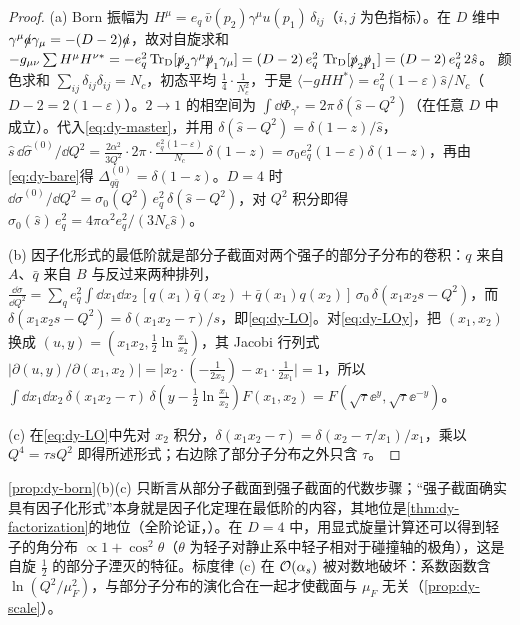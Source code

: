 \begin{proof}
(a) Born 振幅为 $H^\mu=e_q\,\bar v(p_2)\gamma^\mu u(p_1)\,\delta_{ij}$（$i,j$ 为色指标）。在 $D$ 维中 $\gamma^\mu\slashed{a}\gamma_\mu=-(D-2)\slashed{a}$，故对自旋求和
$-g_{\mu\nu}\sum H^\mu H^{\nu*}=-e_q^2\operatorname{Tr}_{\mathrm{D}}[\slashed{p}_2\gamma^\mu\slashed{p}_1\gamma_\mu]=(D-2)\,e_q^2\,\operatorname{Tr}_{\mathrm{D}}[\slashed{p}_2\slashed{p}_1]=(D-2)\,e_q^2\,2\hat s$。
颜色求和 $\sum_{ij}\delta_{ij}\delta_{ij}=N_c$，初态平均 $\frac14\cdot\frac1{N_c^2}$，于是 $\langle-gHH^*\rangle=e_q^2(1-\varepsilon)\hat s/N_c$（$D-2=2(1-\varepsilon)$）。$2\to1$ 的相空间为 $\int\dd\Phi_{\gamma^*}=2\pi\,\delta(\hat s-Q^2)$（在任意 $D$ 中成立）。代入\cref{eq:dy-master}，并用 $\delta(\hat s-Q^2)=\delta(1-z)/\hat s$，
$\hat s\,\dd\hat\sigma^{(0)}/\dd Q^2=\frac{2\alpha^2}{3Q^2}\cdot2\pi\cdot\frac{e_q^2(1-\varepsilon)}{N_c}\,\delta(1-z)=\sigma_0e_q^2(1-\varepsilon)\delta(1-z)$，再由\cref{eq:dy-bare}得 $\Delta^{(0)}_{q\bar q}=\delta(1-z)$。$D=4$ 时 $\dd\hat\sigma^{(0)}/\dd Q^2=\sigma_0(Q^2)\,e_q^2\,\delta(\hat s-Q^2)$，对 $Q^2$ 积分即得 $\sigma_0(\hat s)\,e_q^2=4\pi\alpha^2e_q^2/(3N_c\hat s)$。

(b) 因子化形式的最低阶就是部分子截面对两个强子的部分子分布的卷积：$q$ 来自 $A$、$\bar q$ 来自 $B$ 与反过来两种排列，
$\frac{\dd\sigma}{\dd Q^2}=\sum_qe_q^2\int\dd x_1\dd x_2\,[q(x_1)\bar q(x_2)+\bar q(x_1)q(x_2)]\,\sigma_0\,\delta(x_1x_2s-Q^2)$，而 $\delta(x_1x_2s-Q^2)=\delta(x_1x_2-\tau)/s$，即\cref{eq:dy-LO}。对\cref{eq:dy-LOy}，把 $(x_1,x_2)$ 换成 $(u,y)=(x_1x_2,\frac12\ln\frac{x_1}{x_2})$，其 Jacobi 行列式
$\big|\partial(u,y)/\partial(x_1,x_2)\big|=\big|x_2\cdot(-\tfrac{1}{2x_2})-x_1\cdot\tfrac{1}{2x_1}\big|=1$，所以 $\int\dd x_1\dd x_2\,\delta(x_1x_2-\tau)\,\delta(y-\frac12\ln\frac{x_1}{x_2})F(x_1,x_2)=F(\sqrt\tau\ee^{y},\sqrt\tau\ee^{-y})$。

(c) 在\cref{eq:dy-LO}中先对 $x_2$ 积分，$\delta(x_1x_2-\tau)=\delta(x_2-\tau/x_1)/x_1$，乘以 $Q^4=\tau sQ^2$ 即得所述形式；右边除了部分子分布之外只含 $\tau$。
\end{proof}

\cref{prop:dy-born}(b)(c) 只断言从部分子截面到强子截面的代数步骤；“强子截面确实具有因子化形式”本身就是因子化定理在最低阶的内容，其地位是\cref{thm:dy-factorization}的地位（全阶论证，\tagA）。在 $D=4$ 中，用显式旋量计算还可以得到轻子的角分布 $\propto1+\cos^2\theta$（$\theta$ 为轻子对静止系中轻子相对于碰撞轴的极角），这是自旋 $\frac12$ 的部分子湮灭的特征。标度律 (c) 在 $\mathcal{O}\!\left(\alpha_s\right)$ 被对数地破坏：系数函数含 $\ln(Q^2/\mu_F^2)$，与部分子分布的演化合在一起才使截面与 $\mu_F$ 无关（\cref{prop:dy-scale}）。

